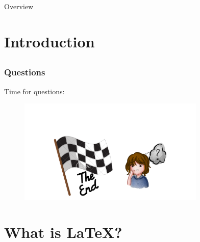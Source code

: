 \documentclass{beamer}
\begin{document}
\begin{frame}[label=inhalt]{Overview}
	\tableofcontents
\end{frame}

\section{Introduction}


\subsection*{}

\begin{frame}
	\frametitle<presentation>{Questions}
	\begin{block}{Time for questions:}
		\begin{figure}
		\centering
			\includegraphics[height=5cm]{figures/questionstime.pdf}
		\label{fig:questions}
	\end{figure}
	\end{block}
\end{frame}

\section{What is \LaTeX?}

\subsection*{}
\end{document}
